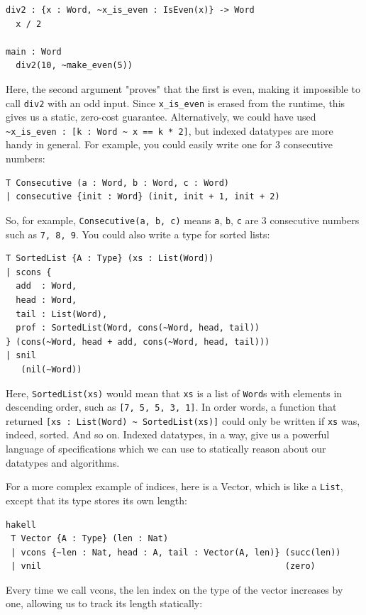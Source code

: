 \documentclass{article}
\theoremstyle{definition}
\theoremstyle{theorem}
\begin{document}
\begin{lstlisting}
div2 : {x : Word, ~x_is_even : IsEven(x)} -> Word
  x / 2

main : Word
  div2(10, ~make_even(5))
\end{lstlisting}

Here, the second argument "proves" that the first is even, making it impossible
to call \verb|div2| with an odd input. Since \verb|x_is_even| is erased from the
runtime, this gives us a static, zero-cost guarantee. Alternatively, we could
have used \verb|~x_is_even : [k : Word ~ x == k * 2]|, but indexed datatypes are
more handy in general. For example, you could easily write one for 3 consecutive
numbers:

\begin{lstlisting}
T Consecutive (a : Word, b : Word, c : Word)
| consecutive {init : Word} (init, init + 1, init + 2)
\end{lstlisting}

So, for example, \verb|Consecutive(a, b, c)| means \verb|a|, \verb|b|, \verb|c|
are 3 consecutive numbers such as \verb|7, 8, 9|. You could also write a type
for sorted lists:

\begin{lstlisting}
T SortedList {A : Type} (xs : List(Word))
| scons {
  add  : Word,
  head : Word,
  tail : List(Word),
  prof : SortedList(Word, cons(~Word, head, tail))
} (cons(~Word, head + add, cons(~Word, head, tail)))
| snil
   (nil(~Word))
\end{lstlisting}

Here, \verb|SortedList(xs)| would mean that \verb|xs| is a list of \verb|Word|s
with elements in descending order, such as \verb|[7, 5, 5, 3, 1]|. In order
words, a function that returned \verb|[xs : List(Word) ~ SortedList(xs)]| could
only be written if \verb|xs| was, indeed, sorted. And so on. Indexed datatypes,
in a way, give us a powerful language of specifications which we can use to
statically reason about our datatypes and algorithms.

For a more complex example of indices, here is a Vector, which is like a
\verb|List|, except that its type stores its own length:

\begin{lstlisting}hakell
 T Vector {A : Type} (len : Nat)
 | vcons {~len : Nat, head : A, tail : Vector(A, len)} (succ(len))
 | vnil                                                (zero)
\end{lstlisting}

Every time we call vcons, the len index on the type of the vector increases by one, allowing us to track its length statically:
\end{document}
